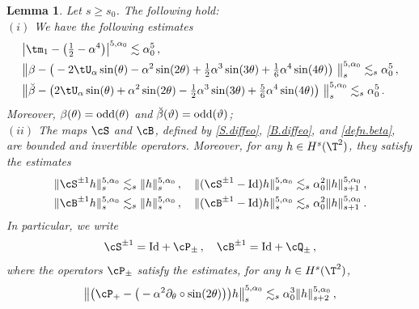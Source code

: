 \documentclass[a4paper,reqno,10pt]{article}
\newtheorem{lem}{Lemma}[section]
\newcommand{\pa}{\partial}
\begin{document}
\begin{lem}\label{lemma.reparam.0}
	Let $s\geq s_0$. The following hold:
	\\[1mm]
	\noindent $(i)$ We have the following estimates
	\begin{align}
		&	\big| \tm_{1} - \big( \tfrac12 -  \alpha^4 \big) \big|^{5,\alpha_{0}} \lesssim \alpha_{0}^5 \,, \label{m1alpha0.est} \\
		&	\big\| \beta -\big( -2\tU_{\alpha} \sin(\theta) -\alpha^2 \sin(2\theta) +\tfrac12 \alpha^3 \sin(3\theta) + \tfrac{1}{6} \alpha^4 \sin(4\theta) \big)\ \big\|_{s}^{5,\alpha_{0}}  \lesssim_{s} \alpha_{0}^5 \,, \label{beta0.est} \\
		&	\big\| \breve\beta - \big(2\tU_{\alpha} \sin(\theta) + \alpha^2 \sin(2\theta) - \tfrac12 \alpha^3 \sin(3\theta) + \tfrac{5}{6} \alpha^4 \sin(4\theta) \big)\ \big\|_{s}^{5,\alpha_{0}}  \lesssim_{s} \alpha_{0}^5 \,. \label{brevebeta0.est} 
	\end{align}
	Moreover, $\beta(\theta)={\rm odd}(\theta)$ and $\breve{\beta}(\vartheta)={\rm odd}(\vartheta)$;
	\\[1mm]
	\noindent $(ii)$
    The maps $\cS$ and $\cB$, defined by \eqref{S.diffeo}, \eqref{B.diffeo}, and \eqref{defn.beta}, are bounded and invertible operators. Moreover, for any $h\in H^s(\T^2)$, they satisfy the estimates
	\begin{align}
		&	\| \cS^{\pm 1} h \|_{s}^{5,\alpha_{0}}  \lesssim_{s} \| h \|_{s}^{5,\alpha_{0}} \,, \quad 	\| (\cS^{\pm 1} -{\rm Id}) h \|_{s}^{5,\alpha_{0}}  \lesssim_{s} \alpha_{0}^2  \| h \|_{s+1}^{5,\alpha_{0}} \label{bounded.S.est}\,, \\
        &	\| \cB^{\pm 1} h \|_{s}^{5,\alpha_{0}}  \lesssim_{s} \| h \|_{s}^{5,\alpha_{0}} \,, \quad 	\| (\cB^{\pm 1} -{\rm Id}) h \|_{s}^{5,\alpha_{0}}  \lesssim_{s} \alpha_{0}^2  \| h \|_{s+1}^{5,\alpha_{0}} \label{bounded.B.est}\,.
	\end{align}
	In particular, we write
	\begin{equation}\label{cS.minus.Id}
		\cS^{\pm 1} = {\rm Id} + \cP_{\pm} \,, \quad \cB^{\pm 1} = {\rm Id} + \cQ_{\pm} \,,
	\end{equation}
	where the operators $\cP_{\pm}$ satisfy the estimates, for any $h\in H^s(\T^2)$,
	\begin{align}
	& 	\big\| \big(\cP_{+} -\big( -\alpha^2\pa_{\theta}\circ \sin(2\theta) \big) \big)h \big\|_{s}^{5,\alpha_{0}}  \lesssim_{s} \alpha_{0}^3 \| h \|_{s+2}^{5,\alpha_{0}} \,, \label{S.expand.est}  \\

\end{align}
\end{lem}
\end{document}
